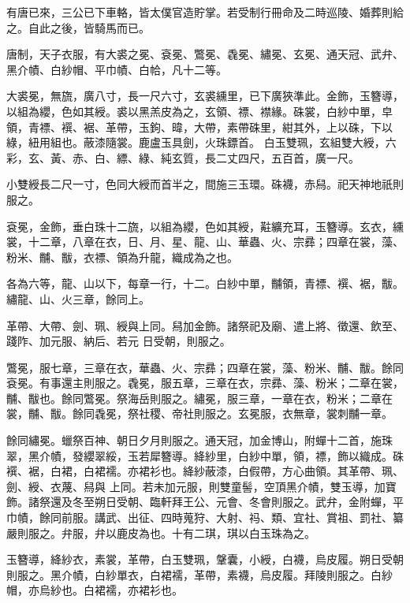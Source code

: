\begin{pinyinscope}
 有唐已來，三公已下車輅，皆太僕官造貯掌。若受制行冊命及二時巡陵、婚葬則給之。自此之後，皆騎馬而已。



 唐制，天子衣服，有大裘之冕、袞冕、鷩冕、毳冕、繡冕、玄冕、通天冠、武弁、黑介幘、白紗帽、平巾幘、白帢，凡十二等。



 大裘冕，無旒，廣八寸，長一尺六寸，玄裘纁里，已下廣狹準此。金飾，玉簪導，以組為纓，色如其綬。裘以黑羔皮為之，玄領、褾、襟緣。硃裳，白紗中單，皁領，青褾、襈、裾、革帶，玉鉤、暐，大帶，素帶硃里，紺其外，上以硃，下以綠，紐用組也。蔽漆隨裳。鹿盧玉具劍，火珠鏢首。
 白玉雙珮，玄組雙大綬，六彩，玄、黃、赤、白、縹、綠、純玄質，長二丈四尺，五百首，廣一尺。



 小雙綬長二尺一寸，色同大綬而首半之，間施三玉環。硃襪，赤舄。祀天神地祇則服之。



 袞冕，金飾，垂白珠十二旒，以組為纓，色如其綬，黈纊充耳，玉簪導。玄衣，纁裳，十二章，八章在衣，日、月、星、龍、山、華蟲、火、宗彞；四章在裳，藻、粉米、黼、黻，衣褾、領為升龍，織成為之也。



 各為六等，龍、山以下，每章一行，十二。白紗中單，黼領，青褾、襈、裾，黻。繡龍、山、火三章，餘同上。



 革帶、大帶、劍、珮、綬與上同。舄加金飾。諸祭祀及廟、遣上將、徵還、飲至、踐阼、加元服、納后、若元
 日受朝，則服之。



 鷩冕，服七章，三章在衣，華蟲、火、宗彞；四章在裳，藻、粉米、黼、黻。餘同袞冕。有事還主則服之。毳冕，服五章，三章在衣，宗彞、藻、粉米；二章在裳，黼、黻也。餘同鷩冕。祭海岳則服之。繡冕，服三章，一章在衣，粉米；二章在裳，黼、黻。餘同毳冕，祭社稷、帝社則服之。玄冕服，衣無章，裳刺黼一章。



 餘同繡冕。蠟祭百神、朝日夕月則服之。通天冠，加金博山，附蟬十二首，施珠翠，黑介幘，發纓翠綏，玉若犀簪導。絳紗里，白紗中單，領，褾，飾以織成。硃襈、裾，白裙，白裙襦。亦裙衫也。絳紗蔽漆，白假帶，方心曲領。其革帶、珮、劍、綬、衣蔑、舄與
 上同。若未加元服，則雙童髻，空頂黑介幘，雙玉導，加寶飾。諸祭還及冬至朔日受朝、臨軒拜王公、元會、冬會則服之。武弁，金附蟬，平巾幘，餘同前服。講武、出征、四時蒐狩、大射、祃、類、宜社、賞祖、罰社、纂嚴則服之。弁服，弁以鹿皮為也。十有二琪，琪以白玉珠為之。



 玉簪導，絳紗衣，素裳，革帶，白玉雙珮，鞶囊，小綬，白襪，烏皮履。朔日受朝則服之。黑介幘，白紗單衣，白裙襦，革帶，素襪，烏皮履。拜陵則服之。白紗帽，亦烏紗也。白裙襦，亦裙衫也。




\end{pinyinscope}
